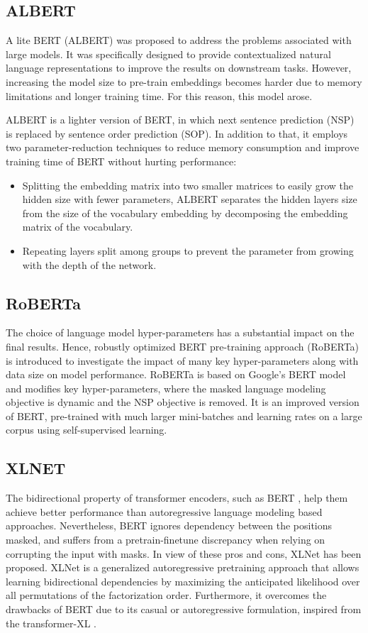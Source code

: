 \documentclass{article}
\begin{document}
\subsection{ALBERT}
A lite BERT (ALBERT) \cite{lan2019albert} was proposed to address the problems associated with large models. It was specifically designed to provide contextualized natural language representations to improve the results on downstream tasks. However, increasing the model size to pre-train embeddings becomes harder due to memory limitations and longer training time. For this reason, this model arose.

ALBERT is a lighter version of BERT, in which next sentence prediction (NSP) is replaced by sentence order prediction (SOP). In addition to that, it employs two parameter-reduction techniques to reduce memory consumption and improve training time of BERT without hurting performance:
\begin{itemize}
  \item Splitting the embedding matrix into two smaller matrices to easily grow the hidden size with fewer parameters, ALBERT separates the hidden layers size from the size of the vocabulary embedding by decomposing the embedding matrix of the vocabulary.
  \item Repeating layers split among groups to prevent the parameter from growing with the depth of the network.
\end{itemize}

\subsection{RoBERTa}
The choice of language model hyper-parameters has a substantial impact on the final results. Hence, robustly optimized BERT pre-training approach (RoBERTa) \cite{liu2019roberta} is introduced to investigate the impact of many key hyper-parameters along with data size on model performance. RoBERTa is based on Google's BERT \cite{devlin2018bert} model and modifies key hyper-parameters, where the masked language modeling objective is dynamic and the NSP objective is removed. It is an improved version of BERT, pre-trained with much larger mini-batches and learning rates on a large corpus using self-supervised learning.

\subsection{XLNET}
The bidirectional property of transformer encoders, such as BERT \cite{devlin2018bert}, help them achieve better performance than autoregressive language modeling based approaches. Nevertheless, BERT ignores dependency between the positions masked, and suffers from a pretrain-finetune discrepancy when relying on corrupting the input with masks. In view of these pros and cons, XLNet \cite{yang2019xlnet} has been proposed. XLNet is a generalized autoregressive pretraining approach that allows learning bidirectional dependencies by maximizing the anticipated likelihood over all permutations of the factorization order. Furthermore, it overcomes the drawbacks of BERT \cite{devlin2018bert} due to its casual or autoregressive formulation, inspired from the transformer-XL \cite{dai2019transformer}.
\end{document}
